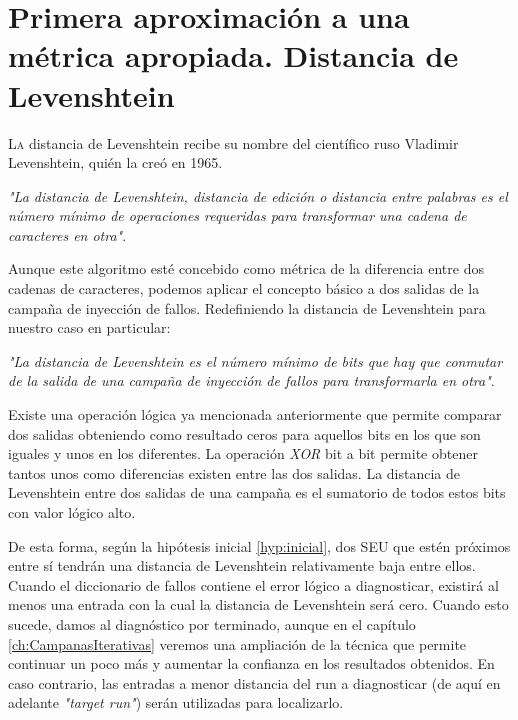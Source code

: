 \chapter{Primera aproximación a una métrica apropiada. Distancia de Levenshtein}
\label{ch:Levenshtein}

\lettrine[lraise=-0.1, lines=2, loversize=0.2]{L}{a} distancia de Levenshtein
recibe su nombre del científico ruso Vladimir Levenshtein, quién la creó en 1965.

\vspace{0.3cm}
\textit{"La distancia de Levenshtein, distancia de edición o distancia entre
palabras es el número mínimo de operaciones requeridas para transformar una cadena
de caracteres en otra"}.
\vspace{-0.2cm}
{}
\vspace{0.3cm}

Aunque este algoritmo esté concebido como métrica de la diferencia entre dos
cadenas de caracteres, podemos aplicar el concepto básico a dos salidas de la
campaña de inyección de fallos. Redefiniendo la distancia de Levenshtein para
nuestro caso en particular:

\vspace{0.3cm}
\textit{"La distancia de Levenshtein es el número mínimo de bits que hay que
conmutar de la salida de una campaña de inyección de fallos para transformarla 
en otra"}.
\vspace{0.3cm}

Existe una operación lógica ya mencionada anteriormente que permite comparar dos
salidas obteniendo como resultado ceros para aquellos bits en los que son iguales
y unos en los diferentes. La operación \textit{XOR} bit a bit permite obtener
tantos unos como diferencias existen entre las dos salidas. La distancia de
Levenshtein entre dos salidas de una campaña es el sumatorio de todos estos bits 
con valor lógico alto.

De esta forma, según la hipótesis inicial \ref{hyp:inicial}, dos \gls{SEU}
que estén próximos entre sí tendrán una distancia de Levenshtein relativamente
baja entre ellos. Cuando el diccionario de fallos contiene el error lógico a
diagnosticar, existirá al menos una entrada con la cual la distancia de
Levenshtein será cero. Cuando esto sucede, damos al diagnóstico por terminado,
aunque en el capítulo \ref{ch:CampanasIterativas} veremos una ampliación de la 
técnica que permite continuar un poco más y aumentar la confianza en los 
resultados obtenidos. En caso contrario, las entradas a menor distancia del run a
diagnosticar (de aquí en adelante \textit{"target run"}) serán utilizadas para
localizarlo.


